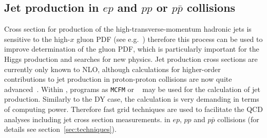 
\subsection{Jet production in $ep$ and $pp$ or $p \bar p$ collisions}
\label{jetsection}

Cross section for production of the high-transverse-momentum hadronic jets
is sensitive to the high-$x$ gluon 
PDF (see e.g.~\cite{MSTWpdf}) 
therefore this process can be used to improve determination of the gluon PDF,
which is particularly important for the Higgs production and searches for new physics.
Jet production cross sections are currently only known to NLO, although 
calculations for higher-order contributions to jet production in proton-proton collisions
are now quite advanced~\cite{nigel:2013,nigel:2010,Currie:2013dwa}. 
Within \fitter, programs as \texttt{MCFM} or
\nlojetpp~\cite{Nagy:1998bb,Nagy:2001fj} may be used for the 
calculation of jet production.
Similarly to the DY case, the calculation 
is very demanding in terms of computing power. 
Therefore fast grid techniques are used  
to facilitate the QCD analyses including jet cross section measurements.
in $ep$, $pp$ and $p\bar{p}$ collisions
(for details see section~\ref{sec:techniques}).





